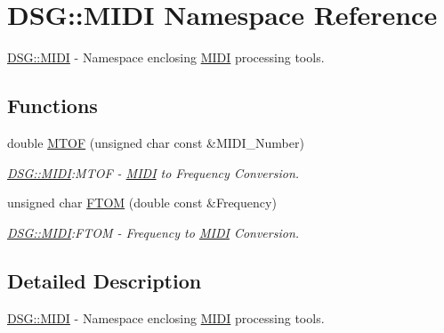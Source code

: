 \hypertarget{namespace_d_s_g_1_1_m_i_d_i}{\section{D\+S\+G\+:\+:M\+I\+D\+I Namespace Reference}
\label{namespace_d_s_g_1_1_m_i_d_i}
}


\hyperlink{namespace_d_s_g_1_1_m_i_d_i}{D\+S\+G\+::\+M\+I\+D\+I} -\/ Namespace enclosing \hyperlink{namespace_d_s_g_1_1_m_i_d_i}{M\+I\+D\+I} processing tools.  


\subsection*{Functions}
\begin{DoxyCompactItemize}
\item 
double \hyperlink{namespace_d_s_g_1_1_m_i_d_i_af0ba40e3fd85269f6f69d0418fbbaea8}{M\+T\+O\+F} (unsigned char const \&M\+I\+D\+I\+\_\+\+Number)
\begin{DoxyCompactList}\small\item\em \hyperlink{namespace_d_s_g_1_1_m_i_d_i}{D\+S\+G\+::\+M\+I\+D\+I}\+:M\+T\+O\+F -\/ \hyperlink{namespace_d_s_g_1_1_m_i_d_i}{M\+I\+D\+I} to Frequency Conversion. \end{DoxyCompactList}\item 
unsigned char \hyperlink{namespace_d_s_g_1_1_m_i_d_i_a79d20f3aac00c6da9b9baed252c04b98}{F\+T\+O\+M} (double const \&Frequency)
\begin{DoxyCompactList}\small\item\em \hyperlink{namespace_d_s_g_1_1_m_i_d_i}{D\+S\+G\+::\+M\+I\+D\+I}\+:F\+T\+O\+M -\/ Frequency to \hyperlink{namespace_d_s_g_1_1_m_i_d_i}{M\+I\+D\+I} Conversion. \end{DoxyCompactList}\end{DoxyCompactItemize}


\subsection{Detailed Description}
\hyperlink{namespace_d_s_g_1_1_m_i_d_i}{D\+S\+G\+::\+M\+I\+D\+I} -\/ Namespace enclosing \hyperlink{namespace_d_s_g_1_1_m_i_d_i}{M\+I\+D\+I} processing tools. 

